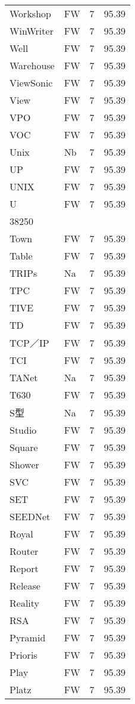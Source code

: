 \documentclass[twocolumn]{book}
\begin{document}
\begin{supertabular}{llrr}
Workshop & FW & 7 &  95.39\\
WinWriter & FW & 7 &  95.39\\
Well & FW & 7 &  95.39\\
Warehouse & FW & 7 &  95.39\\
ViewSonic & FW & 7 &  95.39\\
View & FW & 7 &  95.39\\
VPO & FW & 7 &  95.39\\
VOC & FW & 7 &  95.39\\
Unix & Nb & 7 &  95.39\\
UP & FW & 7 &  95.39\\
UNIX & FW & 7 &  95.39\\
U & FW & 7 &  95.39\\
38250\\
Town & FW & 7 &  95.39\\
Table & FW & 7 &  95.39\\
TRIPs & Na & 7 &  95.39\\
TPC & FW & 7 &  95.39\\
TIVE & FW & 7 &  95.39\\
TD & FW & 7 &  95.39\\
TCP／IP & FW & 7 &  95.39\\
TCI & FW & 7 &  95.39\\
TANet & Na & 7 &  95.39\\
T630 & FW & 7 &  95.39\\
S型 & Na & 7 &  95.39\\
Studio & FW & 7 &  95.39\\
Square & FW & 7 &  95.39\\
Shower & FW & 7 &  95.39\\
SVC & FW & 7 &  95.39\\
SET & FW & 7 &  95.39\\
SEEDNet & FW & 7 &  95.39\\
Royal & FW & 7 &  95.39\\
Router & FW & 7 &  95.39\\
Report & FW & 7 &  95.39\\
Release & FW & 7 &  95.39\\
Reality & FW & 7 &  95.39\\
RSA & FW & 7 &  95.39\\
Pyramid & FW & 7 &  95.39\\
Prioris & FW & 7 &  95.39\\
Play & FW & 7 &  95.39\\
Platz & FW & 7 &  95.39\\

\end{supertabular}
\end{document}
